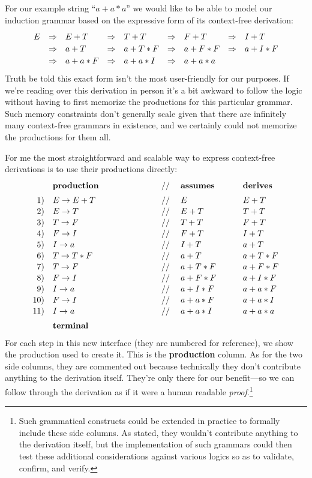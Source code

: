 \documentclass[twoside]{article}
\newcommand{\RA}{\Rightarrow}
\newcommand{\strong}[1]{{\bfseries #1}}
\newcommand{\bfmbox}[1]{\mbox{\bfseries #1}}
\newcommand{\tab}[1][1.125cm]{\hspace{#1}}
\newcommand{\col}[1][0ex]{& \hspace{#1}}
\begin{document}
For our example string ``$ a+a*a $'' we would like to be able to model our
induction grammar based on the expressive form of its context-free derivation:
$$ \def\arraystretch{1.2}
\begin{array}{rclllllll}
E	& \RA & E+T	& \RA & T+T	& \RA & F+T	& \RA & I+T		\\
	& \RA & a+T	& \RA & a+T*F	& \RA & a+F*F	& \RA & a+I*F		\\
	& \RA & a+a*F	& \RA & a+a*I	& \RA & a+a*a
\end{array} $$
Truth be told this exact form isn't the most user-friendly for our purposes. If we're reading over this derivation
in person it's a bit awkward to follow the logic without having to first memorize the productions for this particular
grammar. Such memory constraints don't generally scale given that there are infinitely many context-free grammars
in existence, and we certainly could not memorize the productions for them all.

For me the most straightforward and scalable way to express context-free derivations is to use their productions directly:
$$ \def\arraystretch{1.1}
\tab[0cm] \begin{array}{rlll}
	& \bfmbox{production}	\col[15ex] //\tab[3ex] \bfmbox{assumes}	\col[5ex] \bfmbox{derives}		\\[1ex]
 1)	& E \to E+T		\col[15ex] //\tab[3ex] E		\col[5ex] E+T				\\
 2)	& E \to T		\col[15ex] //\tab[3ex] E+T		\col[5ex] T+T				\\
 3)	& T \to F		\col[15ex] //\tab[3ex] T+T		\col[5ex] F+T				\\
 4)	& F \to I		\col[15ex] //\tab[3ex] F+T		\col[5ex] I+T				\\
 5)	& I \to a		\col[15ex] //\tab[3ex] I+T		\col[5ex] a+T				\\
 6)	& T \to T*F		\col[15ex] //\tab[3ex] a+T		\col[5ex] a+T*F				\\
 7)	& T \to F		\col[15ex] //\tab[3ex] a+T*F		\col[5ex] a+F*F				\\
 8)	& F \to I		\col[15ex] //\tab[3ex] a+F*F		\col[5ex] a+I*F				\\
 9)	& I \to a		\col[15ex] //\tab[3ex] a+I*F		\col[5ex] a+a*F				\\
10)	& F \to I		\col[15ex] //\tab[3ex] a+a*F		\col[5ex] a+a*I				\\
11)	& I \to a		\col[15ex] //\tab[3ex] a+a*I		\col[5ex] a+a*a				\\[1ex]
	& \bfmbox{terminal}
\end{array} $$
For each step in this new interface (they are numbered for reference), we show the production used to create
it. This is the \strong{production} column. As for the two side columns, they are commented out because technically
they don't contribute anything to the derivation itself. They're only there for our benefit---so we can follow through
the derivation as if it were a human readable \emph{proof}.\footnote{Such grammatical constructs could be extended
in practice to formally include these side columns. As stated, they wouldn't contribute anything to the derivation
itself, but the implementation of such grammars could then test these additional considerations against various
logics so as to validate, confirm, and verify.}
\end{document}

